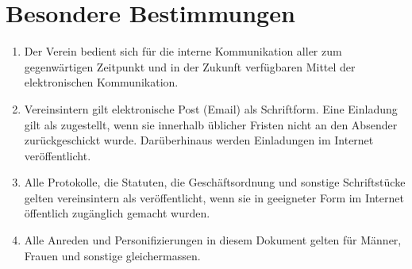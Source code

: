 \documentclass[a4paper,12pt]{article}
\begin{document}
	\section{Besondere Bestimmungen}
		\label{sec:besondere-bestimmungen}
		\begin{enumerate}
			\item Der Verein bedient sich für die interne Kommunikation aller zum gegenwärtigen Zeitpunkt und in der Zukunft verfügbaren Mittel der elektronischen Kommunikation.
			\item Vereinsintern gilt elektronische Post (Email) als Schriftform. Eine Einladung gilt als zugestellt, wenn sie innerhalb üblicher Fristen nicht an den Absender zurückgeschickt wurde. Darüberhinaus werden Einladungen im Internet veröffentlicht.
			\item Alle Protokolle, die Statuten, die Geschäftsordnung und sonstige Schriftstücke gelten vereinsintern als veröffentlicht, wenn sie in geeigneter Form im Internet öffentlich zugänglich gemacht wurden.
			\item Alle Anreden und Personifizierungen in diesem Dokument gelten für Männer, Frauen und sonstige gleichermassen.
		\end{enumerate}
\end{document}
